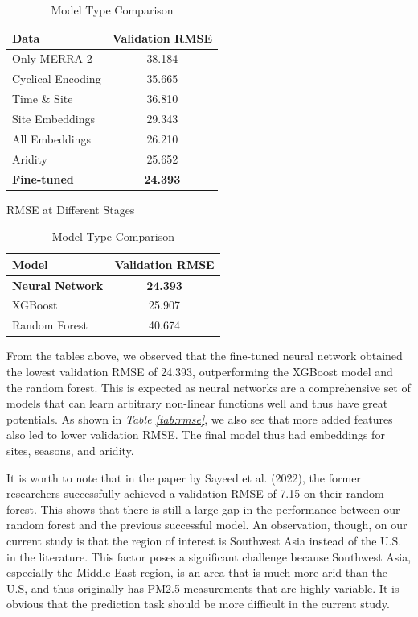 \documentclass[draft]{agujournal2019}
\begin{document}
\begin{table}[htbp]
    \centering
    \begin{minipage}{0.48\linewidth}
        \begin{tabular}{l c}
            \toprule
            \textbf{Data} & \textbf{Validation RMSE} \\
            \midrule
            Only MERRA-2 & 38.184 \\
            Cyclical Encoding & 35.665 \\
            Time \& Site & 36.810 \\
            Site Embeddings & 29.343 \\
            All Embeddings & 26.210 \\
            Aridity & 25.652 \\
            \textbf{Fine-tuned} & \textbf{24.393} \\
            \bottomrule
        \end{tabular}
        \caption{RMSE at Different Stages}
        \label{tab:rmse}
    \end{minipage}
    \quad
    \begin{minipage}{0.48\linewidth}
        \begin{tabular}{l c}
            \toprule
            \textbf{Model} & \textbf{Validation RMSE} \\
            \midrule
            \textbf{Neural Network} & \textbf{24.393} \\
            XGBoost & 25.907 \\
            Random Forest & 40.674 \\
            \bottomrule
        \end{tabular}
        \caption{Model Type Comparison}
        \label{tab:model_type}
    \end{minipage}
\end{table}

From the tables above, we observed that the fine-tuned neural network obtained the lowest validation RMSE of 24.393, outperforming the XGBoost model and the random forest. This is expected as neural networks are a comprehensive set of models that can learn arbitrary non-linear functions well and thus have great potentials. As shown in \textit{Table \ref{tab:rmse}}, we also see that more added features also led to lower validation RMSE. The final model thus had embeddings for sites, seasons, and aridity.

It is worth to note that in the paper by Sayeed et al. (2022), the former researchers successfully achieved a validation RMSE of 7.15 on their random forest. This shows that there is still a large gap in the performance between our random forest and the previous successful model. An observation, though, on our current study is that the region of interest is Southwest Asia instead of the U.S. in the literature. This factor poses a significant challenge because Southwest Asia, especially the Middle East region, is an area that is much more arid than the U.S, and thus originally has PM2.5 measurements that are highly variable. It is obvious that the prediction task should be more difficult in the current study.
\end{document}
